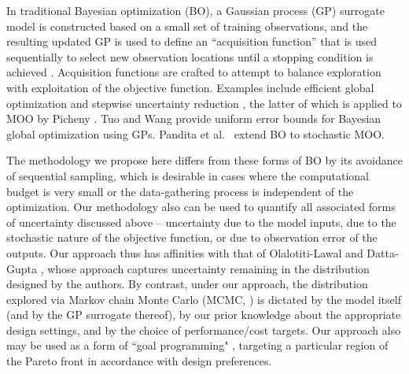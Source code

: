 \documentclass[twocolumn,10pt]{asme2ej}
\begin{document}
%
%
In traditional Bayesian optimization (BO), a Gaussian process (GP) surrogate model is constructed based on a small set of training observations, and the resulting updated GP is used to define an ``acquisition function'' that is used sequentially to select new observation locations until a stopping condition is achieved \cite{Picheny2019}.
%
Acquisition functions are crafted to attempt to balance exploration with exploitation of the objective function.
%
Examples include efficient global optimization \cite{Jones1998} and stepwise uncertainty reduction \cite{Chevalier2014}, the latter of which is applied to MOO by Picheny \cite{Picheny2015}.
%
Tuo and Wang \cite{Tuo2020} provide uniform error bounds for Bayesian global optimization using GPs.
%
Pandita et al.\ \cite{Pandita2018} extend BO to stochastic MOO.
%

The methodology we propose here differs from these forms of BO by its avoidance of sequential sampling, which is desirable in cases where the computational budget is very small or the data-gathering process is independent of the optimization.
%
Our methodology also can be used to quantify all associated forms of uncertainty discussed above -- uncertainty due to the model inputs, due to the stochastic nature of the objective function, or due to observation error of the outputs. Our approach thus has affinities with that of Olalotiti-Lawal and Datta-Gupta \cite{Olalotiti-Lawal2015}, whose approach captures uncertainty remaining in the distribution designed by the authors. By contrast, under our approach, the distribution explored via Markov chain Monte Carlo (MCMC, \cite{Gelfand1990}) is dictated by the model itself (and by the GP surrogate thereof), by our prior knowledge about the appropriate design settings, and by the choice of performance/cost targets. Our approach also may be used as a form of ``goal programming" \cite{Miettinen2008}, targeting a particular region of the Pareto front in accordance with design preferences.
%
%
\end{document}
